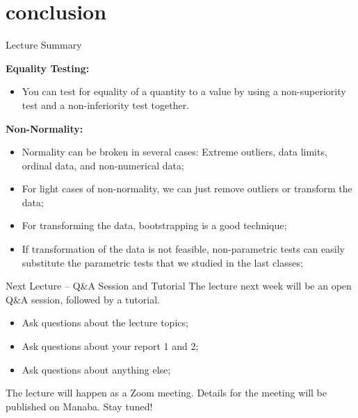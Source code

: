 \section{conclusion}

\begin{frame}{Lecture Summary}

  {\bf Equality Testing:}
  \begin{itemize}
    \item You can test for equality of a quantity to a value by using a non-superiority test and a non-inferiority test together.
  \end{itemize}\bigskip

  {\bf Non-Normality:}
  \begin{itemize}
    \item Normality can be broken in several cases: Extreme outliers, data limits, ordinal data, and non-numerical data;
    \item For light cases of non-normality, we can just remove outliers or transform the data;
    \item For transforming the data, bootstrapping is a good technique;
    \item If transformation of the data is not feasible, non-parametric tests can easily substitute the parametric tests that we studied in the last classes;
  \end{itemize}
\end{frame}

\begin{frame}{Next Lecture -- Q\&A Session and Tutorial}
  The lecture next week will be an open Q\&A session, followed by a tutorial.\smallskip

  \begin{itemize}
    \item Ask questions about the lecture topics;
    \item Ask questions about your report 1 and 2;
    \item Ask questions about anything else;
  \end{itemize}\bigskip

  The lecture will happen as a Zoom meeting. Details for the meeting will be published on Manaba. Stay tuned!
\end{frame}

